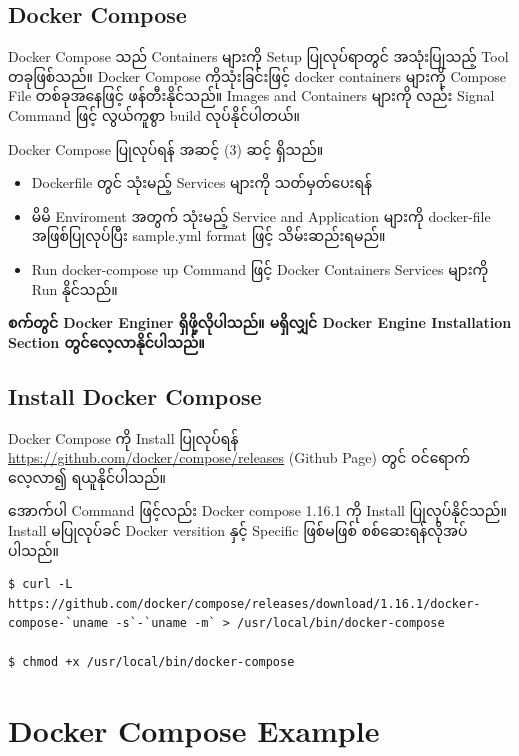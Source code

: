 \documentclass{article}
\begin{document}
\subsection{Docker Compose}\label{docker-compose-1}

Docker Compose သည် Containers များကို Setup ပြုလုပ်ရာတွင် အသုံးပြုသည့်
Tool တခုဖြစ်သည်။ Docker Compose ကိုသုံးခြင်းဖြင့် docker containers
များကို Compose File တစ်ခုအနေဖြင့် ဖန်တီးနိုင်သည်။ Images and Containers
များကို လည်း Signal Command ဖြင့် လွယ်ကူစွာ build လုပ်နိုင်ပါတယ်။

Docker Compose ပြုလုပ်ရန် အဆင့် (3) ဆင့် ရှိသည်။

\begin{itemize}
\itemsep1pt\parskip0pt
\item
  Dockerfile တွင် သုံးမည့် Services များကို သတ်မှတ်ပေးရန်
\item
  မိမိ Enviroment အတွက် သုံးမည့် Service and Application များကို
  docker-file အဖြစ်ပြုလုပ်ပြီး sample.yml format ဖြင့် သိမ်းဆည်းရမည်။
\item
  Run docker-compose up Command ဖြင့် Docker Containers Services များကို
  Run နိုင်သည်။
\end{itemize}

\textbf{စက်တွင် Docker Enginer ရှိဖို့လိုပါသည်။ မရှိလျှင် Docker Engine
Installation Section တွင်လေ့လာနိုင်ပါသည်။}

\subsection{Install Docker Compose}\label{install-docker-compose}

Docker Compose ကို Install ပြုလုပ်ရန်
\url{https://github.com/docker/compose/releases} (Github Page) တွင်
ဝင်ရောက်လေ့လာ၍ ရယူနိုင်ပါသည်။

အောက်ပါ Command ဖြင့်လည်း Docker compose 1.16.1 ကို Install
ပြုလုပ်နိုင်သည်။ Install မပြုလုပ်ခင် Docker versition နှင့် Specific
ဖြစ်မဖြစ် စစ်ဆေးရန်လိုအပ်ပါသည်။

\begin{verbatim}
$ curl -L https://github.com/docker/compose/releases/download/1.16.1/docker-compose-`uname -s`-`uname -m` > /usr/local/bin/docker-compose

$ chmod +x /usr/local/bin/docker-compose
\end{verbatim}

\section{Docker Compose Example}\label{docker-compose-example}
\end{document}
